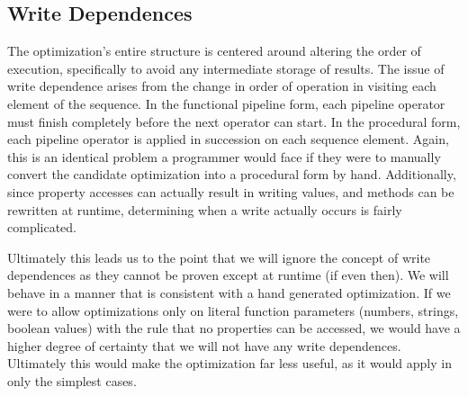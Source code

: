 \subsection{Write Dependences}

The optimization's entire structure is centered around altering the order of execution, specifically to avoid any intermediate storage of results. The issue of write dependence arises from the change in order of operation in visiting each element of the sequence.  In the functional pipeline form, each pipeline operator must finish completely before the next operator can start.  In the procedural form, each pipeline operator is applied in succession on each sequence element.  Again, this is an identical problem a programmer would face if they were to manually convert the candidate optimization into a procedural form by hand.  Additionally, since property accesses can actually result in writing values, and methods can be rewritten at runtime, determining when a write actually occurs is fairly complicated. 

Ultimately this leads us to the point that we will ignore the concept of write dependences as they cannot be proven except at runtime (if even then).  We will behave in a manner that is consistent with a hand generated optimization.  If we were to allow optimizations only on literal function parameters (numbers, strings, boolean values) with the rule that no properties can be accessed, we would have a higher degree of certainty that we will not have any write dependences.  Ultimately this would make the optimization far less useful, as it would apply in only the simplest cases.  